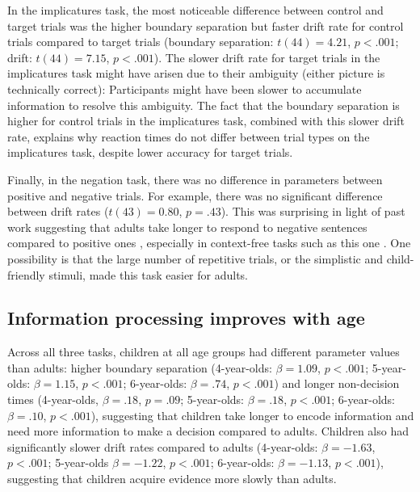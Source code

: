 \documentclass[man, noapacite]{apa2}
\begin{document}
In the implicatures task, the most noticeable difference between control and target trials was the higher boundary separation but faster drift rate for control trials compared to target trials (boundary separation: $t(44) = 4.21$, $p< .001$; drift: $t(44) = 7.15$, $p< .001$). The slower drift rate for target trials in the implicatures task might have arisen due to their ambiguity (either picture is technically correct): Participants might have been slower to accumulate information to resolve this ambiguity. The fact that the boundary separation is higher for control trials in the implicatures task, combined with this slower drift rate, explains why reaction times do not differ between trial types on the implicatures task, despite lower accuracy for target trials.

Finally, in the negation task, there was no difference in parameters between positive and negative trials. For example, there was no significant difference between drift rates ($t(43) = 0.80$, $p = .43$). This was surprising in light of past work suggesting that adults take longer to respond to negative sentences compared to positive ones \cite{hclark1972}, especially in context-free tasks such as this one \cite{nordmeyer2014a}. One possibility is that the large number of repetitive trials, or the simplistic and child-friendly stimuli, made this task easier for adults.


\subsection{Information processing improves with age}


Across all three tasks, children at all age groups had different parameter values than adults: higher boundary separation (4-year-olds: $\beta = 1.09$, $p <.001$; 5-year-olds: $\beta = 1.15$, $p <.001$; 6-year-olds: $\beta = .74$, $p <.001$) and longer non-decision times (4-year-olds, $\beta = .18$, $p = .09$; 5-year-olds: $\beta = .18$, $p <.001$; 6-year-olds: $\beta = .10$, $p <.001$), suggesting that children take longer to encode information and need more information to make a decision compared to adults. Children also had significantly slower drift rates compared to adults (4-year-olds: $\beta = -1.63$, $p <.001$; 5-year-olds $\beta = -1.22$, $p <.001$; 6-year-olds: $\beta = -1.13$, $p <.001$), suggesting that children acquire evidence more slowly than adults.
\end{document}
